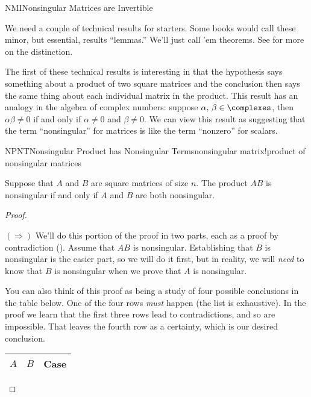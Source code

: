 \begin{subsect}{NMI}{Nonsingular Matrices are Invertible}
%
\begin{para}We need a couple of technical results for starters.  Some books would call these minor, but essential, results ``lemmas.''  We'll just call 'em theorems.  See  for more on the distinction.\end{para}
%
\begin{para}The first of these technical results is interesting in that the hypothesis says something about a product of two square matrices and the conclusion then says the same thing about each individual matrix in the product.  This result has an analogy in the algebra of complex numbers: suppose $\alpha,\,\beta\in\complexes$, then $\alpha\beta\neq 0$ if and only if $\alpha\neq 0$ and $\beta\neq 0$.  We can view this result as suggesting that the term ``nonsingular'' for matrices is like the term ``nonzero'' for scalars.\end{para}
%
\begin{theorem}{NPNT}{Nonsingular Product has Nonsingular Terms}{nonsingular matrix!product of nonsingular matrices}
%
\begin{para}Suppose that $A$ and $B$ are square matrices of size $n$.  The product $AB$ is nonsingular if and only if $A$ and $B$ are both nonsingular.\end{para}
\end{theorem}
%
\begin{proof}
\begin{para}$(\Rightarrow)$\quad
We'll do this portion of the proof in two parts, each as a proof by contradiction ().  Assume that $AB$ is nonsingular. Establishing that $B$ is nonsingular is the easier part, so we will do it first, but in reality, we will {\em need} to know that $B$ is nonsingular when we prove that $A$ is nonsingular.\end{para}
%
\begin{para}You can also think of this proof as being a study of four possible conclusions in the table below.  One of the four rows {\em must} happen (the list is exhaustive).  In the proof we learn that the first three rows lead to contradictions, and so are impossible.  That leaves the fourth row as a certainty, which is our desired conclusion.
%
\begin{center}
\begin{tabular}{l|l|c}
\multicolumn{1}{c}{$A$}&
\multicolumn{1}{c}{$B$}&
\multicolumn{1}{c}{Case}\\\hline\hline

\end{tabular}
\end{center}
\end{para}
\end{proof}
\end{subsect}
